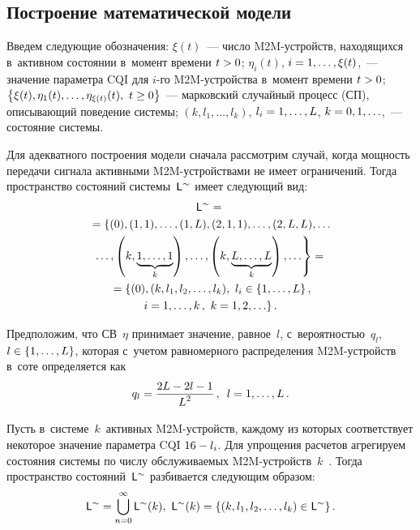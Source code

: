 \begin{multicols}{2}
\vspace*{-6pt}


\section{Построение математической модели}

  Введем следующие обозначения: $\xi(t)$~--- чис\-ло M2M-устройств, 
находящихся в~активном состоянии в~момент времени $t\hm> 0$; $\eta_i(t)$, 
$i\hm=1,\ldots , \xi(t)$,~--- значение параметра CQI для \mbox{$i$-го} 
 M2M-устрой\-ст\-ва в~момент времени $t\hm> 0$; $\left\{ \xi(t),\eta_1(t),\ldots , 
\eta_{\xi(t)}(t),\ t\hm\geq 0\right\}$~--- марковский случайный процесс (СП), 
описывающий поведение системы; $(k, l_1, \ldots , l_k)$, $l_i\hm=1, \ldots , L$, 
$k\hm=0,1,\ldots$,~--- состояние системы. 
  
  Для адекватного построения модели сначала рассмотрим случай, когда 
мощность передачи сигнала активными M2M-устрой\-ст\-ва\-ми не имеет 
ограничений. Тогда пространство состояний системы~${\sf L}^{\sim}$ имеет 
следующий вид:
  \begin{multline*}
  {\sf L}^{\sim}={}\\
  {}=\left\{ (0), (1,1),\ldots , (1,L), (2,1,1), \ldots , (2,L,L),\ldots\right.\\
\left.  \ldots , 
\left(k, \underbrace{1,\ldots , 1}_{k}\right), \ldots ,  \left( k, \underbrace{L,\ldots 
,L}_{k}\right), \ldots\right\}={}\\
  {}= \{ (0), (k, l_1, l_2,\ldots , l_k),\ l_i\in \{1,\ldots , L\}\,,\\
   i=1,\ldots , k\,,\ 
k=1,2,\ldots\}\,.
  \end{multline*}
  
  Предположим, что СВ~$\eta$ принимает значение, равное~$l$, 
с~вероятностью~$q_l$, $l\hm\in \{1,\ldots ,L\}$, которая с~учетом равномерного 
распределения M2M-устройств в~соте определяется как 
$$
q_l= \displaystyle\frac{\displaystyle 2L-2l- 1\mathstrut}{\displaystyle L^2\mathstrut}\,, \enskip l=1,\ldots , L\,.
$$
  
  Пусть в~системе~$k$~активных M2M-устройств, каж\-до\-му из которых 
соответствует некоторое значение параметра CQI $16\hm- l_i$. Для упрощения 
расчетов агрегируем состояния системы по числу обслуживаемых  
M2M-устройств~$k$~\cite{13-gud}. Тогда пространство состояний~${\sf 
L}^{\sim}$ разбивается следующим образом: 
  $$
  {\sf L}^{\sim} = \mathop{\bigcup}\limits_{n=0}^\infty {\sf L}^{\sim}(k),\ 
  {\sf  L}^{\sim}(k)= \left\{ \left(k, l_1, l_2, \ldots , l_k\right) \in 
  {\sf L}^{\sim}\right\}.
  $$


\end{multicols}

